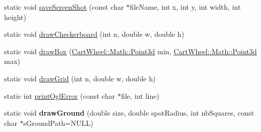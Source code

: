 \begin{DoxyCompactItemize}
\item 
static void \hyperlink{classCartWheel_1_1GL_1_1GLUtils_a8a4d9bd5a7caa9038105119062162c5f}{saveScreenShot} (const char $\ast$fileName, int x, int y, int width, int height)
\item 
static void \hyperlink{classCartWheel_1_1GL_1_1GLUtils_ac6cdc06205424c564337ea4506057f45}{drawCheckerboard} (int n, double w, double h)
\item 
static void \hyperlink{classCartWheel_1_1GL_1_1GLUtils_ab72d0390a1e79c0e814a23ca00740fa6}{drawBox} (\hyperlink{classCartWheel_1_1Math_1_1Point3d}{CartWheel::Math::Point3d} min, \hyperlink{classCartWheel_1_1Math_1_1Point3d}{CartWheel::Math::Point3d} max)
\item 
static void \hyperlink{classCartWheel_1_1GL_1_1GLUtils_a3a90981814aeb1cf3d560a3acd5d8f88}{drawGrid} (int n, double w, double h)
\item 
static int \hyperlink{classCartWheel_1_1GL_1_1GLUtils_a1f9f9aac7039f03ceff1337f5b91c280}{printOglError} (const char $\ast$file, int line)
\item 
\hypertarget{classCartWheel_1_1GL_1_1GLUtils_af4df1eb4fb5c3f540a0b8c5c863a035f}{
static void {\bfseries drawGround} (double size, double spotRadius, int nbSquares, const char $\ast$sGroundPath=NULL)}
\label{classCartWheel_1_1GL_1_1GLUtils_af4df1eb4fb5c3f540a0b8c5c863a035f}

\end{DoxyCompactItemize}


